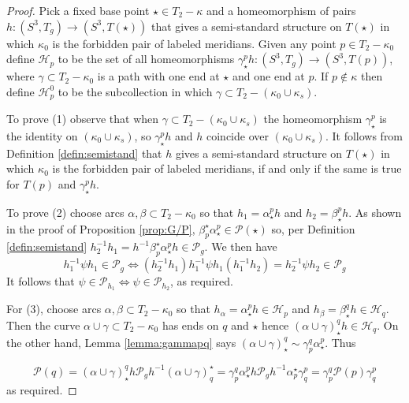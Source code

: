 \documentclass[12pt]{amsart}
\newcommand{\calP}{\mathcal P}
\newcommand{\calH}{\mathcal H}
\begin{document}
\begin{proof}  Pick a fixed base point $\star \in T_2 - \kappa$ and a homeomorphism of pairs $h:(S^3, T_g) \to (S^3, T(\star))$ that gives a semi-standard structure on $T(\star)$ in which $\kappa_0$ is the forbidden pair of labeled meridians.  Given any point $p \in T_2 - \kappa_0$ define $\calH_p$ to be the set of all homeomorphisms $ \gamma_{\star}^p h : (S^3, T_g) \to (S^3, T(p))$, where $\gamma \subset T_2 - \kappa_0$ is a path with one end at $\star$ and one end at $p$.  If $p \notin \kappa$ then define $\calH^0_p$ to be the subcollection in which $\gamma \subset T_2 - (\kappa_0 \cup \kappa_s)$.  

To prove (1) observe that when $\gamma \subset T_2 - (\kappa_0 \cup \kappa_s)$ the homeomorphism $\gamma_{\star}^p$ %
is the identity on $(\kappa_0 \cup \kappa_s)$, so $ \gamma_{\star}^p h $ and $h$ coincide over $(\kappa_0 \cup \kappa_s)$.  It follows from Definition \ref{defin:semistand} that $h$ gives a semi-standard structure on $T(\star)$ in which $\kappa_0$ is the forbidden pair of labeled meridians, if and only if the same is true for $T(p)$ and $ \gamma_{\star}^p h $.

To prove (2) choose arcs $\alpha, \beta \subset T_2 - \kappa_0$ so that $h_1 = \alpha_{\star}^p h$ and $h_2 = \beta_{\star}^p h$.  %
As shown in the proof of Proposition \ref{prop:G/P}, $\beta_p^{\star}\alpha_{\star}^p \in \calP(\star)$ so, per Definition \ref{defin:semistand}
$h_2^{-1}h_1 = h^{-1}\beta_p^{\star}\alpha_{\star}^p h \in \calP_g$.  We then have
\[ %
h_1^{-1} \psi h_1 \in \calP_g \iff  (h_2^{-1}h_1) h_1^{-1} \psi h_1 (h_1^{-1} h_2) = h_2^{-1} \psi h_2 \in \calP_g 
\]
It follows that $\psi \in \calP_{h_1} \iff \psi \in \calP_{h_2}$, as required.  

For (3), choose arcs $\alpha, \beta \subset T_2 - \kappa_0$ so that $h_{\alpha}= \alpha_{\star}^p h \in \calH_p$ and $h_{\beta} = \beta_{\star}^q h \in \calH_q$. Then the curve $\alpha \cup \gamma \subset T_2 - \kappa_0$ has ends on $q$ and $\star$ hence $(\alpha \cup \gamma)_{\star}^q h \in \calH_q$.  On the other hand, Lemma \ref{lemma:gammapq} says $(\alpha \cup \gamma)_{\star}^q \sim \gamma_p^q \alpha_{\star}^p$.   Thus 

\[\calP(q) = (\alpha \cup \gamma)_{\star}^q h \calP_g h^{-1} (\alpha \cup \gamma)^{\star}_q=  \gamma_p^q \alpha_{\star}^p h \calP_g   h^{-1} \alpha^{\star}_p \gamma_q^p  = \gamma_p^q \calP(p) \gamma_q^p\] as required.
\end{proof}
\end{document}

